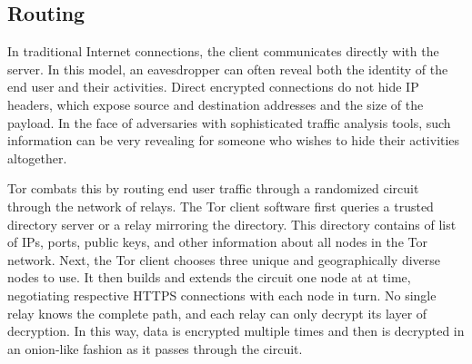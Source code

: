 \subsection{Routing}

In traditional Internet connections, the client communicates directly with the server. In this model, an eavesdropper can often reveal both the identity of the end user and their activities. Direct encrypted connections do not hide IP headers, which expose source and destination addresses and the size of the payload. In the face of adversaries with sophisticated traffic analysis tools, such information can be very revealing for someone who wishes to hide their activities altogether.

Tor combats this by routing end user traffic through a randomized circuit through the network of relays. The Tor client software first queries a trusted directory server or a relay mirroring the directory. This directory contains of list of IPs, ports, public keys, and other information about all nodes in the Tor network.\cite{Xin2009} Next, the Tor client chooses three unique and geographically diverse nodes to use. It then builds and extends the circuit one node at at time, negotiating respective HTTPS connections with each node in turn. No single relay knows the complete path, and each relay can only decrypt its layer of decryption. In this way, data is encrypted multiple times and then is decrypted in an onion-like fashion as it passes through the circuit.

